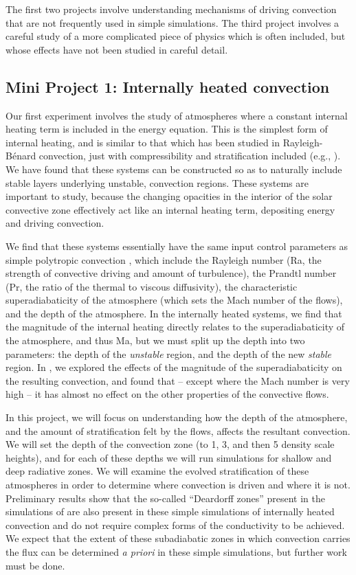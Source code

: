 \documentclass[aps, pre, onecolumn, nofootinbib, notitlepage, groupedaddress, amsfonts, amssymb, amsmath, longbibliography]{revtex4-1}
\newcommand{\RB}{Rayleigh-B\'{e}nard }
\begin{document}
The first two projects involve understanding mechanisms of driving convection that are not
frequently used in simple simulations.  The third project involves a careful study of a
more complicated piece of physics which is often included, but whose effects have not
been studied in careful detail.

\subsection{Mini Project 1: Internally heated convection}
Our first experiment involves the study of atmospheres where a constant internal heating
term is included in the energy equation.  This is the simplest form of internal heating,
and is similar to that which has been studied in \RB convection, just with compressibility
and stratification included (e.g., \cite{goluskin&spiegel2012}).  
We have found that these systems can be constructed so as to
naturally include stable layers underlying unstable, convection regions.  These systems
are important to study, because the changing opacities in the interior of the solar convective
zone effectively act like an internal heating term, depositing energy and driving convection.

We find that these systems essentially have the same input control parameters as simple polytropic
convection \cite{anders&brown2017}, which include the Rayleigh number (Ra, the strength of
convective driving and amount of turbulence), the Prandtl number (Pr, the ratio of the thermal
to viscous diffusivity), the characteristic superadiabaticity of the atmosphere (which sets the Mach
number of the flows), and the depth of the atmosphere.  In the internally heated systems, we
find that the magnitude of the internal heating directly relates to the superadiabaticity of the
atmosphere, and thus Ma, but we must split up the depth into two parameters: the depth of the
\emph{unstable} region, and the depth of the new \emph{stable} region.  In \cite{anders&brown2017},
we explored the effects of the magnitude of the superadiabaticity on the resulting convection,
and found that -- except where the Mach number is very high -- it has almost no effect on the
other properties of the convective flows.  

In this project, we will focus on understanding how the depth of the atmosphere, and the amount
of stratification felt by the flows, affects the resultant convection.  We will set the depth
of the convection zone (to 1, 3, and then 5 density scale heights), and for each of these depths
we will run simulations for shallow and deep radiative zones.  We will examine the evolved
stratification of these atmospheres in order to determine where convection is driven and where
it is not.  Preliminary results show that the so-called ``Deardorff zones'' present in the
simulations of \cite{kapyla&all2017} are also present in these simple simulations of
internally heated convection and do not require complex forms of the conductivity to be achieved.
We expect that the extent of these subadiabatic zones in which convection carries the flux can
be determined \emph{a priori} in these simple simulations, but further work must be done.
\end{document}
